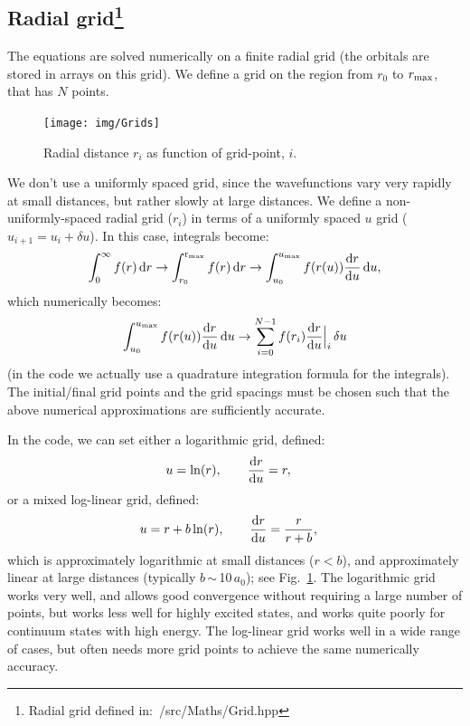 \documentclass[10pt,twocolumn,a4paper]{article}%
\newcommand{\be}{\begin{equation}}
\newcommand{\ee}{\end{equation}}
\def\d{\ensuremath{{\rm d}}}
\begin{document}
\subsection[Radial grid]{Radial grid\label{sec:grid}\footnote{Radial grid defined in:~/src/Maths/Grid.hpp}}

The equations are solved numerically on a finite radial grid (the orbitals are stored in arrays on this grid).
We define a grid on the region from $r_0$ to $r_{\rm max}$, that has $N$ points.

\begin{figure}
\centering
\texttt{[image: img/Grids]}
\caption{\small Radial distance $r_i$ as function of grid-point, $i$.\label{Fig:grids}}
\end{figure}



We don't use a uniformly spaced grid, since the wavefunctions vary very rapidly at small distances, but rather slowly at large distances.
We define a non-uniformly-spaced radial grid ($r_i$) in terms of a uniformly spaced $u$ grid ($u_{i+1}=u_i+\delta u$).
In this case, integrals become:
\be
\int_{0}^{\infty} f(r)\,\d r \to
\int_{r_0}^{\rm r_{max}} f(r)\,\d r \to
\int_{u_0}^{u_{\rm max}} f(r(u))\frac{\d r}{\d u}\,\d u,
\ee
which numerically becomes:
\be
\int_{u_0}^{u_{\rm max}} f(r(u))\frac{\d r}{\d u}\,\d u \to
\sum_{i=0}^{N-1} f(r_i)\frac{\d r}{\d u}\Big|_i\,\delta u
\ee
(in the code we actually use a quadrature integration formula for the integrals).
The initial/final grid points and the grid spacings must be chosen such that the above numerical approximations are sufficiently accurate.

In the code, we can set either a logarithmic grid, defined:
\begin{align}
u &= \ln(r), \qquad
\frac{\d r}{\d u} = r,
\end{align}
or a mixed log-linear grid, defined:
\begin{align}
u &= r + b \ln(r), \qquad
\frac{\d r}{\d u} = \frac{r}{r + b},
\end{align}
which is approximately logarithmic at small distances ($r<b$), and approximately linear at large distances (typically $b$\,$\sim$\,10\,$a_0$); see Fig.~\ref{Fig:grids}.
The logarithmic grid works very well, and allows good convergence without requiring a large number of points, but works less well for highly excited states, and works quite poorly for continuum states with high energy.
The log-linear grid works well in a wide range of cases, but often needs more grid points to achieve the same numerically accuracy.
\end{document}
